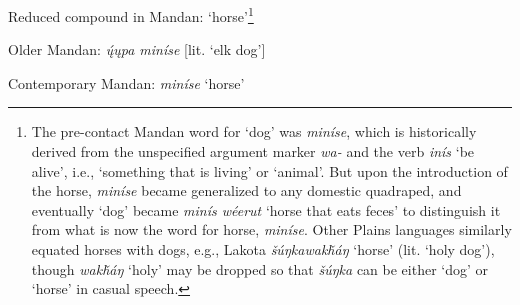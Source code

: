 \begin{exe}

\item\label{semantichorse} Reduced compound in Mandan: `horse'\footnote{The pre-contact Mandan word for `dog' was \textit{miníse}, which is historically derived from the unspecified argument marker \textit{wa-} and the verb \textit{inís} `be alive', i.e., `something that is living' or `animal'. But upon the introduction of the horse, \textit{miníse} became generalized to any domestic quadraped, and eventually `dog' became \textit{minís wéerut} `horse that eats feces' to distinguish it from what is now the word for horse, \textit{miníse}. Other Plains languages similarly equated horses with dogs, e.g., Lakota \textit{šúŋkawakȟáŋ} `horse' (lit. `holy dog'), though \textit{wakȟáŋ} `holy' may  be dropped so that \textit{šúŋka} can be either `dog' or `horse' in casual speech.}

	\begin{xlist}

	\item Older Mandan: \textit{ų́ųpa miníse} [lit. `elk dog'] \citep{kipp1852}

	\item Contemporary Mandan: \textit{miníse} `horse' \citep{kasak2014}

	\end{xlist}
	

    
    
    

\end{exe}

